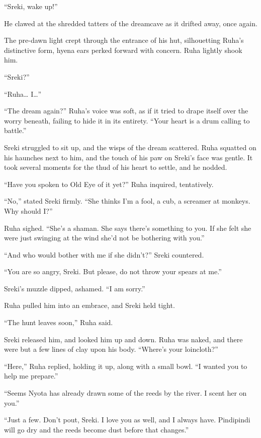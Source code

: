 \secdiv

\noindent ``Sreki, wake up!''

He clawed at the shredded tatters of the dreamcave as it drifted away, once again.

The pre-dawn light crept through the entrance of his hut, silhouetting Ruha's distinctive form, hyena ears perked forward with concern. Ruha lightly shook him.

``Sreki?''

``Ruha\ldots{} I\ldots''

``The dream again?'' Ruha's voice was soft, as if it tried to drape itself over the worry beneath, failing to hide it in its entirety. ``Your heart is a drum calling to battle.''

Sreki struggled to sit up, and the wisps of the dream scattered. Ruha squatted on his haunches next to him, and the touch of his paw on Sreki's face was gentle. It took several moments for the thud of his heart to settle, and he nodded.

``Have you spoken to Old Eye of it yet?'' Ruha inquired, tentatively.

``No,'' stated Sreki firmly. ``She thinks I'm a fool, a cub, a screamer at monkeys. Why should I?''

Ruha sighed. ``She's a shaman. She says there's something to you. If she felt she were just swinging at the wind she'd not be bothering with you.''

``And who would bother with me if she didn't?'' Sreki countered.

``You are so angry, Sreki. But please, do not throw your spears at me.''

Sreki's muzzle dipped, ashamed. ``I am sorry.''

Ruha pulled him into an embrace, and Sreki held tight.

``The hunt leaves soon,'' Ruha said.

Sreki released him, and looked him up and down. Ruha was naked, and there were but a few lines of clay upon his body. ``Where's your loincloth?''

``Here,'' Ruha replied, holding it up, along with a small bowl. ``I wanted you to help me prepare.''

``Seems Nyota has already drawn some of the reeds by the river. I scent her on you.''

``Just a few. Don't pout, Sreki. I love you as well, and I always have. Pindipindi will go dry and the reeds become dust before that changes.''

